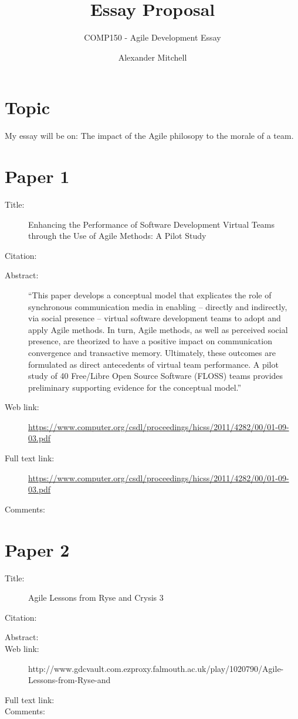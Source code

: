 \documentclass{scrartcl}
\title{Essay Proposal}
\subtitle{COMP150 - Agile Development Essay}
\author{Alexander Mitchell}
\begin{document}
\maketitle

\section*{Topic}

My essay will be on: The impact of the Agile philosopy to the morale of a team.


\section*{Paper 1}
\begin{description}
\item[Title:] Enhancing the Performance of Software Development Virtual Teams through the Use of Agile Methods: A Pilot Study
\item[Citation:] \cite{shannon}
\item[Abstract:] ``This paper develops a conceptual model that
explicates the role of synchronous communication
media in enabling – directly and indirectly, via social
presence – virtual software development teams to
adopt and apply Agile methods. In turn, Agile
methods, as well as perceived social presence, are
theorized to have a positive impact on
communication convergence and transactive
memory. Ultimately, these outcomes are formulated
as direct antecedents of virtual team performance. A
pilot study of 40 Free/Libre Open Source Software
(FLOSS) teams provides preliminary supporting
evidence for the conceptual model.''
\item[Web link:] \url{https://www.computer.org/csdl/proceedings/hicss/2011/4282/00/01-09-03.pdf}
\item[Full text link:] \url{https://www.computer.org/csdl/proceedings/hicss/2011/4282/00/01-09-03.pdf}
\item[Comments:]
\end{description}

\section*{Paper 2}
\begin{description}
\item[Title:] Agile Lessons from Ryse and Crysis 3
\item[Citation:] \cite{bibtex_key}
\item[Abstract:] 
\item[Web link:] http://www.gdcvault.com.ezproxy.falmouth.ac.uk/play/1020790/Agile-Lessons-from-Ryse-and
\item[Full text link:] 
\item[Comments:] 
\end{description}
\end{document}
